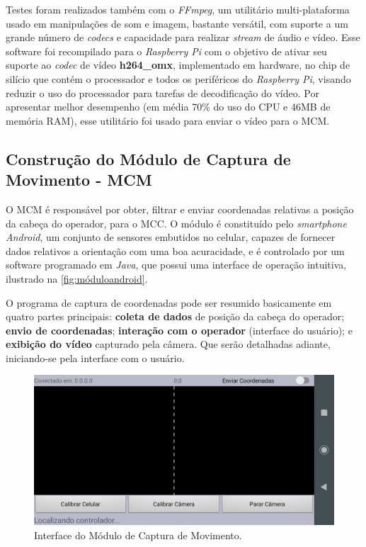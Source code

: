 Testes foram realizados também com o \textit{FFmpeg}, um utilitário multi-plataforma usado em manipulações de som e imagem, bastante versátil, com suporte a um grande número de \textit{codecs} e capacidade para realizar \textit{stream} de áudio e vídeo. Esse software foi recompilado para o \textit{Raspberry Pi} com o objetivo de ativar seu suporte ao \textit{codec} de vídeo \textbf{h264\_omx}, implementado em hardware, no chip de silício que contém o processador e todos os periféricos do \textit{Raspberry Pi}, visando reduzir o uso do processador para tarefas de decodificação do vídeo. Por apresentar melhor desempenho (em média 70\% do uso do CPU e 46MB de memória RAM), esse utilitário foi usado para enviar o vídeo para o MCM.



\subsection{Construção do Módulo de Captura de Movimento - MCM}
\label{subsec:assemmodcapmov}

O MCM é responsável por obter, filtrar e enviar coordenadas relativas a posição da cabeça do operador, para o MCC. O módulo é constituído pelo \textit{smartphone} \textit{Android}, um conjunto de sensores embutidos no celular, capazes de fornecer dados relativos a orientação com uma boa acuracidade, e é controlado por um software programado em \textit{Java}, que possui uma interface de operação intuitiva, ilustrado na \autoref{fig:móduloandroid}. \par

O programa de captura de coordenadas pode ser resumido basicamente em quatro partes principais: \textbf{coleta de dados} de posição da cabeça do operador; \textbf{envio de coordenadas}; \textbf{interação com o operador} (interface do usuário); e \textbf{exibição do vídeo} capturado pela câmera. Que serão detalhadas adiante, iniciando-se pela  interface com o usuário.\par


\begin{figure}[H]
	\centering
	\includegraphics[width=1\textwidth]{figuras/modulo_android_1.png}
	\caption{Interface do Módulo de Captura de Movimento.}
	\label{fig:móduloandroid}
\end{figure}

